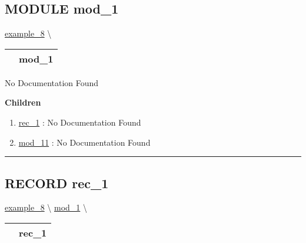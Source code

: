 \subsection*{\textsf{\colorbox{headtoc}{\color{white} MODULE}
mod\_1}}

\hypertarget{ecldoc:intest.in1intest.example_8.mod_1}{}
\hspace{0pt} \hyperlink{ecldoc:intest.in1intest.example_8}{example_8} \textbackslash 

{\renewcommand{\arraystretch}{1.5}
\begin{tabularx}{\textwidth}{|>{\raggedright\arraybackslash}l|X|}
\hline
\hspace{0pt}\mytexttt{\color{red} } & \textbf{mod\_1} \\
\hline
\end{tabularx}
}

\par





No Documentation Found







\textbf{Children}
\begin{enumerate}
\item \hyperlink{ecldoc:intest.in1intest.example_8.mod_1.rec_1}{rec\_1}
: No Documentation Found
\item \hyperlink{ecldoc:intest.in1intest.example_8.mod_1.mod_11}{mod\_11}
: No Documentation Found
\end{enumerate}

\rule{\linewidth}{0.5pt}

\subsection*{\textsf{\colorbox{headtoc}{\color{white} RECORD}
rec\_1}}

\hypertarget{ecldoc:intest.in1intest.example_8.mod_1.rec_1}{}
\hspace{0pt} \hyperlink{ecldoc:intest.in1intest.example_8}{example_8} \textbackslash 
\hspace{0pt} \hyperlink{ecldoc:intest.in1intest.example_8.mod_1}{mod_1} \textbackslash 

{\renewcommand{\arraystretch}{1.5}
\begin{tabularx}{\textwidth}{|>{\raggedright\arraybackslash}l|X|}
\hline
\hspace{0pt}\mytexttt{\color{red} } & \textbf{rec\_1} \\
\hline
\end{tabularx}
}

